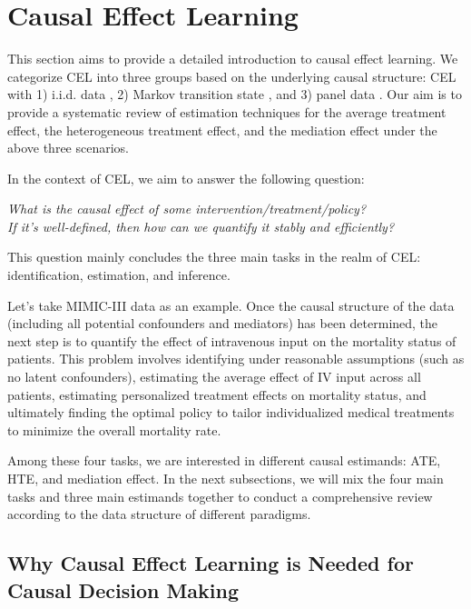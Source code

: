 \section{Causal Effect Learning} \label{sec:CEL}
This section aims to provide a detailed introduction to causal effect learning. We categorize \acrshort{CEL} into three groups based on the underlying causal structure: \acrshort{CEL} with 1) i.i.d. data \citep{kunzel2019metalearners,athey2019generalized}, 2) Markov transition state \citep{liu2018breaking,jiang2016doubly,kallus2022efficiently}, and 3) panel data \citep{viviano2022synthetic,lechner2011estimation}. 
Our aim is to provide a systematic review of estimation techniques for the average treatment effect, the heterogeneous treatment effect, and the mediation effect under the above three scenarios.

In the context of \acrshort{CEL}, we aim to answer the following question:
\begin{center}
    \textit{What is the causal effect of some intervention/treatment/policy? \\If it's well-defined, then how can we quantify it stably and efficiently?}
\end{center}
This question mainly concludes the three main tasks in the realm of \acrshort{CEL}: identification, estimation, and inference. 

Let's take \acrshort{MIMIC-III} data as an example. Once the causal structure of the data (including all potential confounders and mediators) has been determined, the next step is to quantify the effect of intravenous input on the mortality status of patients. This problem involves identifying under reasonable assumptions (such as no latent confounders), estimating the average effect of IV input across all patients, estimating personalized treatment effects on mortality status, and ultimately finding the optimal policy to tailor individualized medical treatments to minimize the overall mortality rate.

Among these four tasks, we are interested in different causal estimands: \acrfull{ATE}, \acrfull{HTE}, and mediation effect. In the next subsections, we will mix the four main tasks and three main estimands together to conduct a comprehensive review according to the data structure of different paradigms.

\subsection{Why Causal Effect Learning is Needed for Causal Decision Making}

